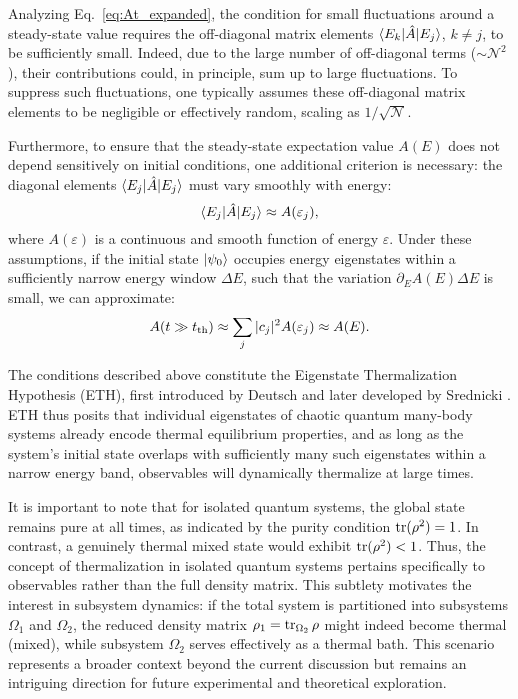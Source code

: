 Analyzing Eq.~\eqref{eq:At_expanded}, the condition for small fluctuations around a steady-state value requires the off-diagonal matrix elements $\bk{E_k}[\hat{A}]{E_j}$, $k\neq j$, to be sufficiently small. Indeed, due to the large number of off-diagonal terms ($\sim \mathcal{N}^2$), their contributions could, in principle, sum up to large fluctuations. To suppress such fluctuations, one typically assumes these off-diagonal matrix elements to be negligible or effectively random, scaling as $1/\sqrt{\mathcal{N}}$.

Furthermore, to ensure that the steady-state expectation value $A(E)$ does not depend sensitively on initial conditions, one additional criterion is necessary: the diagonal elements $\bk{E_j}[\hat{A}]{E_j}$ must vary smoothly with energy:
\begin{equation*}
\bk{E_j}[\hat{A}]{E_j} \approx A(\varepsilon_j),
\end{equation*}
where $A(\varepsilon)$ is a continuous and smooth function of energy $\varepsilon$. Under these assumptions, if the initial state $\left| \psi_0 \right\rangle$ occupies energy eigenstates within a sufficiently narrow energy window $\Delta E$, such that the variation $\partial_E A(E)\Delta E$ is small, we can approximate:
\begin{equation*}
A(t \gg t_{\textnormal{th}}) \approx \sum_j |c_j|^2 A(\varepsilon_j) \approx A(E).
\end{equation*}

The conditions described above constitute the Eigenstate Thermalization Hypothesis (ETH), first introduced by Deutsch \cite{deutsch_quantum_1991} and later developed by Srednicki \cite{srednicki_chaos_1994}. ETH thus posits that individual eigenstates of chaotic quantum many-body systems already encode thermal equilibrium properties, and as long as the system's initial state overlaps with sufficiently many such eigenstates within a narrow energy band, observables will dynamically thermalize at large times.

It is important to note that for isolated quantum systems, the global state remains pure at all times, as indicated by the purity condition $\mathop{\mathrm{tr}}\nolimits(\rho^2) = 1$. In contrast, a genuinely thermal mixed state would exhibit $\mathop{\mathrm{tr}}\nolimits(\rho^2) < 1$. Thus, the concept of thermalization in isolated quantum systems pertains specifically to observables rather than the full density matrix. This subtlety motivates the interest in subsystem dynamics: if the total system is partitioned into subsystems $\Omega_1$ and $\Omega_2$, the reduced density matrix $\rho_1 = \mathop{\mathrm{tr}}\nolimits_{\Omega_2} \rho$ might indeed become thermal (mixed), while subsystem $\Omega_2$ serves effectively as a thermal bath. This scenario represents a broader context beyond the current discussion but remains an intriguing direction for future experimental and theoretical exploration.

